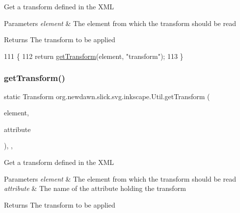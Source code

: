 Get a transform defined in the X\+ML


\begin{DoxyParams}{Parameters}
{\em element} & The element from which the transform should be read \\
\hline
\end{DoxyParams}
\begin{DoxyReturn}{Returns}
The transform to be applied 
\end{DoxyReturn}

\begin{DoxyCode}
111                                                    \{
112         \textcolor{keywordflow}{return} \mbox{\hyperlink{classorg_1_1newdawn_1_1slick_1_1svg_1_1inkscape_1_1_util_a96fccbd8e9ba06987f1e5d978f2b9ff4}{getTransform}}(element, \textcolor{stringliteral}{"transform"});
113     \}
\end{DoxyCode}
\mbox{\label{classorg_1_1newdawn_1_1slick_1_1svg_1_1inkscape_1_1_util_ae45ba35602eb8b3071c732e60edf609d}} 
\subsubsection{\texorpdfstring{get\+Transform()}{getTransform()}\hspace{0.1cm}{\footnotesize\ttfamily [2/2]}}
{\footnotesize\ttfamily static Transform org.\+newdawn.\+slick.\+svg.\+inkscape.\+Util.\+get\+Transform (\begin{DoxyParamCaption}\item[{Element}]{element,  }\item[{String}]{attribute }\end{DoxyParamCaption})\hspace{0.3cm}{\ttfamily [inline]}, {\ttfamily [static]}, {\ttfamily [package]}}

Get a transform defined in the X\+ML


\begin{DoxyParams}{Parameters}
{\em element} & The element from which the transform should be read \\
\hline
{\em attribute} & The name of the attribute holding the transform \\
\hline
\end{DoxyParams}
\begin{DoxyReturn}{Returns}
The transform to be applied 
\end{DoxyReturn}

